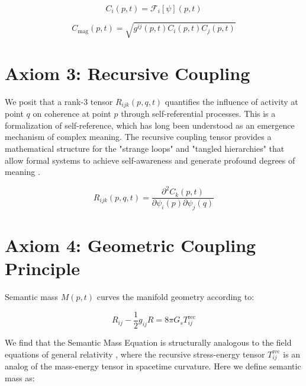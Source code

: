 \begin{equation}
C_i(p,t) = \mathcal{F}_i[\psi](p,t)
\end{equation}

\begin{equation}
C_{\text{mag}}(p,t) = \sqrt{g^{ij}(p,t) C_i(p,t) C_j(p,t)}
\end{equation}


\section{Axiom 3: Recursive Coupling}
\label{1.3:axiom_3_recursive_coupling}

We posit that a rank-3 tensor \(R_{ijk}(p,q,t)\) quantifies the influence of activity at point \(q\) on coherence at point \(p\) through self-referential processes. This is a formalization of self-reference, which has long been understood as an emergence mechanism of complex meaning. The recursive coupling tensor provides a mathematical structure for the "strange loops" and "tangled hierarchies" that allow formal systems to achieve self-awareness and generate profound degrees of meaning \autocite{Hofstadter1979}.

\begin{equation}
R_{ijk}(p,q,t) = \frac{\partial^2 C_k(p,t)}{\partial \psi_i(p) \partial \psi_j(q)}
\end{equation}


\section{Axiom 4: Geometric Coupling Principle}
\label{1.4:axiom_4_geometric_coupling_principle}

Semantic mass \(M(p,t)\) curves the manifold geometry according to:

\begin{equation}
R_{ij} - \frac{1}{2}g_{ij}R = 8\pi G_s T^{\text{rec}}_{ij}
\end{equation}

We find that the Semantic Mass Equation is structurally analogous to the field equations of general relativity \autocite{Einstein1915, MisnerThorneWheeler1973, Wald1984}, where the recursive stress-energy tensor \(T^{\text{rec}}_{ij}\) is an analog of the mass-energy tensor in spacetime curvature. Here we define semantic mass as:

